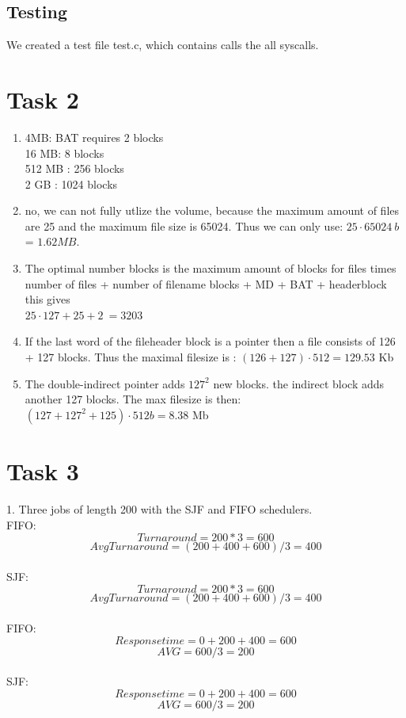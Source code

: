 \documentclass[12pt]{article}
\begin{document}
\subsection*{Testing}
We created a test file test.c, which contains calls the all syscalls.\\
\section*{Task 2}
\begin{enumerate}
  \item 4MB: BAT requires 2 blocks\\
    16 MB: 8 blocks \\
    512 MB : 256 blocks \\
    2 GB : 1024 blocks \\
  \item no, we can not fully utlize the volume, because the maximum amount of files are 25 and the maximum file size is 65024. Thus we can only use: $25 \cdot 65024\ b$ = $1.62 MB$.\\
  \item The optimal number blocks is the maximum amount of blocks for files times number    
  of  files + number of filename blocks + MD + BAT + headerblock this gives \\
  $25\cdot127 + 25 + 2 \ = 3203$
  \item If the last word of the fileheader block is a pointer then a file consists of 126 + 127 blocks. Thus the maximal filesize is : $(126+127)\cdot512 = 129.53$ Kb
  \item The double-indirect pointer adds $127^2$ new blocks. the indirect block adds another 127 blocks. The max filesize is then: $(127+127^2+125)\cdot 512b = 8.38 $ Mb
\end{enumerate}

\section*{Task 3}
1. Three jobs of length 200 with the SJF and FIFO schedulers.\\

\noindent FIFO:
$$Turnaround = 200 * 3 = 600$$ $$AvgTurnaround = (200 + 400 + 600) / 3 = 400$$\\
\noindent SJF:
$$Turnaround = 200 * 3 = 600$$     $$AvgTurnaround = (200 + 400 + 600) / 3 = 400$$\\

\noindent FIFO:
$$Response time = 0 + 200 + 400 = 600$$     $$AVG = 600/3 = 200$$\\
\noindent SJF:
$$Response time = 0 + 200 + 400 = 600$$     $$AVG = 600/3 = 200$$\\
\end{document}
